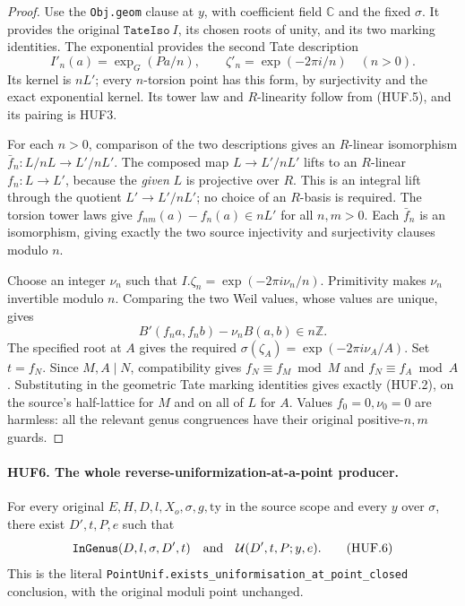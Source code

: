 \begin{proof}
Use the \texttt{Obj.geom} clause at \(y\), with coefficient
field \(\mathbb C\) and the fixed \(\sigma\).  It provides
the original \(\texttt{TateIso}\ I\), its chosen roots of
unity, and its two marking identities.
The exponential provides the second Tate description
\[
  I'_n(a)=\exp_G(Pa/n),\qquad
                      \zeta'_n=\exp(-2\pi i/n)\quad(n>0).
\]
Its kernel is \(nL'\); every \(n\)-torsion point has this
form, by surjectivity and the exact exponential kernel.
Its tower law and \(R\)-linearity follow from (HUF.5),
and its pairing is HUF3.

For each \(n>0\), comparison of the two descriptions gives
an \(R\)-linear isomorphism
\(\bar f_n:L/nL\to L'/nL'\).
The composed map \(L\to L'/nL'\) lifts to an
\(R\)-linear \(f_n:L\to L'\), because the \emph{given}
\(L\) is projective over \(R\).  This is an integral
lift through the quotient \(L'\to L'/nL'\); no choice of
an \(R\)-basis is required.  The torsion tower laws give
\(f_{nm}(a)-f_n(a)\in nL'\) for all \(n,m>0\).
Each \(\bar f_n\) is an isomorphism, giving exactly the
two source injectivity and surjectivity clauses modulo \(n\).

Choose an integer \(\nu_n\) such that
\(I.\zeta_n=\exp(-2\pi i\nu_n/n)\).  Primitivity makes
\(\nu_n\) invertible modulo \(n\).
Comparing the two Weil values, whose values are unique,
gives
\[
           B'(f_na,f_nb)-\nu_nB(a,b)\in n\mathbb Z.
\]
The specified root at \(A\) gives the required
\(\sigma(\zeta_A)=\exp(-2\pi i\nu_A/A)\).
Set \(t=f_N\).  Since \(M,A\mid N\), compatibility
gives \(f_N\equiv f_M\bmod M\) and
\(f_N\equiv f_A\bmod A\).  Substituting in the geometric
Tate marking identities gives exactly (HUF.2), on the
source's half-lattice for \(M\) and on all of \(L\)
for \(A\).  Values \(f_0=0,\nu_0=0\) are harmless:
all the relevant genus congruences have their original
positive-\(n,m\) guards.
\end{proof}

\paragraph{HUF6. The whole reverse-uniformization-at-a-point producer.}
\label{claim:HUF6}
For every original \(E,H,D,l,X_o,\sigma,g,\mathrm{ty}\)
in the source scope and every \(y\) over \(\sigma\),
there exist \(D',t,P,e\) such that
\[
 \texttt{InGenus}(D,l,\sigma,D',t)
                 \quad\hbox{and}\quad \mathcal U(D',t,P;y,e).
 \tag{HUF.6}
\]
This is the literal
\texttt{PointUnif.exists\_uniformisation\_at\_point\_closed}
conclusion, with the original moduli point unchanged.

